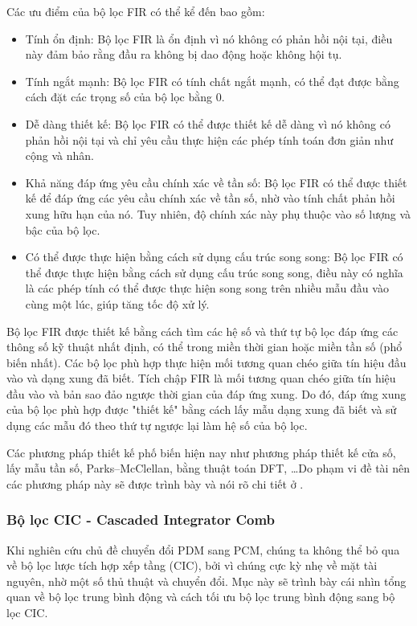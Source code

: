 Các ưu điểm của bộ lọc FIR có thể kể đến bao gồm:
\begin{itemize}
\item Tính ổn định: Bộ lọc FIR là ổn định vì nó không có phản hồi nội tại, điều này đảm bảo rằng đầu ra không bị dao động hoặc không hội tụ.
\item Tính ngắt mạnh: Bộ lọc FIR có tính chất ngắt mạnh, có thể đạt được bằng cách đặt các trọng số của bộ lọc bằng 0.
\item Dễ dàng thiết kế: Bộ lọc FIR có thể được thiết kế dễ dàng vì nó không có phản hồi nội tại và chỉ yêu cầu thực hiện các phép tính toán đơn giản như cộng và nhân.
\item Khả năng đáp ứng yêu cầu chính xác về tần số: Bộ lọc FIR có thể được thiết kế để đáp ứng các yêu cầu chính xác về tần số, nhờ vào tính chất phản hồi xung hữu hạn của nó. Tuy nhiên, độ chính xác này phụ thuộc vào số lượng và bậc của bộ lọc.
\item Có thể được thực hiện bằng cách sử dụng cấu trúc song song: Bộ lọc FIR có thể được thực hiện bằng cách sử dụng cấu trúc song song, điều này có nghĩa là các phép tính có thể được thực hiện song song trên nhiều mẫu đầu vào cùng một lúc, giúp tăng tốc độ xử lý.
\end{itemize}

Bộ lọc FIR được thiết kế bằng cách tìm các hệ số và thứ tự bộ lọc đáp ứng các thông số kỹ thuật nhất định, có thể trong miền thời gian hoặc miền tần số (phổ biến nhất). Các bộ lọc phù hợp thực hiện mối tương quan chéo giữa tín hiệu đầu vào và dạng xung đã biết. Tích chập FIR là mối tương quan chéo giữa tín hiệu đầu vào và bản sao đảo ngược thời gian của đáp ứng xung. Do đó, đáp ứng xung của bộ lọc phù hợp được "thiết kế" bằng cách lấy mẫu dạng xung đã biết và sử dụng các mẫu đó theo thứ tự ngược lại làm hệ số của bộ lọc. \cite{signalsystem}

Các phương pháp thiết kế phố biến hiện nay như phương pháp thiết kế cửa số, lấy mẫu tần số, Parks–McClellan,  bằng thuật toán DFT, 	\ldots Do phạm vi đề tài nên các phương pháp này sẽ được trình bày và nói rõ chi tiết ở \cite{TAN2014xiii}.

\subsubsection{Bộ lọc CIC -  Cascaded Integrator Comb} \label{cic_filter_ref}
Khi nghiên cứu chủ đề chuyển đổi PDM sang PCM, chúng ta không thể bỏ qua về bộ lọc lược tích hợp xếp tầng (CIC), bởi vì chúng cực kỳ nhẹ về mặt tài nguyên, nhờ một số thủ thuật và chuyển đổi. Mục này sẽ trình bày cái nhìn tổng quan về bộ lọc trung bình động và cách tối ưu bộ lọc trung bình động sang bộ lọc CIC.

